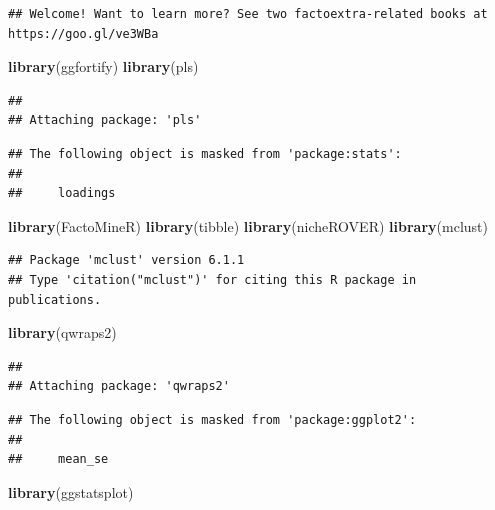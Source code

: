 \documentclass[
]{article}
\newenvironment{Shaded}{\begin{snugshade}}{\end{snugshade}}
\newcommand{\FunctionTok}[1]{\textcolor[rgb]{0.13,0.29,0.53}{\textbf{#1}}}
\newcommand{\NormalTok}[1]{#1}
\begin{document}
\begin{verbatim}
## Welcome! Want to learn more? See two factoextra-related books at https://goo.gl/ve3WBa
\end{verbatim}

\begin{Shaded}
\begin{Highlighting}[]
\FunctionTok{library}\NormalTok{(ggfortify)}
\FunctionTok{library}\NormalTok{(pls)}
\end{Highlighting}
\end{Shaded}

\begin{verbatim}
## 
## Attaching package: 'pls'
\end{verbatim}

\begin{verbatim}
## The following object is masked from 'package:stats':
## 
##     loadings
\end{verbatim}

\begin{Shaded}
\begin{Highlighting}[]
\FunctionTok{library}\NormalTok{(FactoMineR)}
\FunctionTok{library}\NormalTok{(tibble)}
\FunctionTok{library}\NormalTok{(nicheROVER)}
\FunctionTok{library}\NormalTok{(mclust)}
\end{Highlighting}
\end{Shaded}

\begin{verbatim}
## Package 'mclust' version 6.1.1
## Type 'citation("mclust")' for citing this R package in publications.
\end{verbatim}

\begin{Shaded}
\begin{Highlighting}[]
\FunctionTok{library}\NormalTok{(qwraps2)}
\end{Highlighting}
\end{Shaded}

\begin{verbatim}
## 
## Attaching package: 'qwraps2'
\end{verbatim}

\begin{verbatim}
## The following object is masked from 'package:ggplot2':
## 
##     mean_se
\end{verbatim}

\begin{Shaded}
\begin{Highlighting}[]
\FunctionTok{library}\NormalTok{(ggstatsplot)}
\end{Highlighting}
\end{Shaded}
\end{document}
